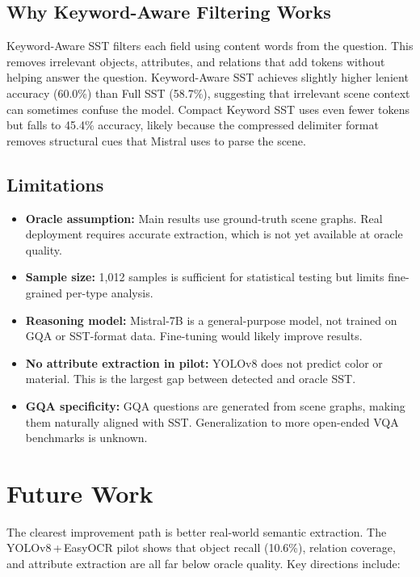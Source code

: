 \documentclass[10pt,twocolumn]{article}
\begin{document}
\subsection{Why Keyword-Aware Filtering Works}

Keyword-Aware SST filters each field using content words from the question. This removes irrelevant objects, attributes, and relations that add tokens without helping answer the question. Keyword-Aware SST achieves slightly higher lenient accuracy (60.0\%) than Full SST (58.7\%), suggesting that irrelevant scene context can sometimes confuse the model. Compact Keyword SST uses even fewer tokens but falls to 45.4\% accuracy, likely because the compressed delimiter format removes structural cues that Mistral uses to parse the scene.

\subsection{Limitations}

\begin{itemize}
  \item \textbf{Oracle assumption:} Main results use ground-truth scene graphs. Real deployment requires accurate extraction, which is not yet available at oracle quality.
  \item \textbf{Sample size:} 1,012 samples is sufficient for statistical testing but limits fine-grained per-type analysis.
  \item \textbf{Reasoning model:} Mistral-7B is a general-purpose model, not trained on GQA or SST-format data. Fine-tuning would likely improve results.
  \item \textbf{No attribute extraction in pilot:} YOLOv8 does not predict color or material. This is the largest gap between detected and oracle SST.
  \item \textbf{GQA specificity:} GQA questions are generated from scene graphs, making them naturally aligned with SST. Generalization to more open-ended VQA benchmarks is unknown.
\end{itemize}

\section{Future Work}

The clearest improvement path is better real-world semantic extraction. The YOLOv8\,+\,EasyOCR pilot shows that object recall (10.6\%), relation coverage, and attribute extraction are all far below oracle quality. Key directions include:
\end{document}
